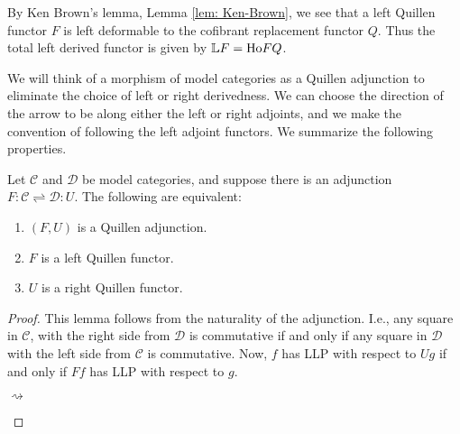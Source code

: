 \documentclass[../thesis.tex]{subfiles}
\begin{document}
            \begin{remark}
                By Ken Brown's lemma, Lemma \ref{lem: Ken-Brown}, we see that a left Quillen functor $F$ is left deformable to the cofibrant replacement functor $Q$. Thus the total left derived functor is given by $\mathbb{L}F = \tt{Ho} FQ$.
            \end{remark}

            We will think of a morphism of model categories as a Quillen adjunction to eliminate the choice of left or right derivedness. We can choose the direction of the arrow to be along either the left or right adjoints, and we make the convention of following the left adjoint functors. We summarize the following properties.

            \begin{lemma}\label{lem: Quill-adj}
                Let $\mathcal{C}$ and $\mathcal{D}$ be model categories, and suppose there is an adjunction $F:\mathcal{C}\rightleftharpoons\mathcal{D}:U$. The following are equivalent:
                \begin{enumerate}
                    \item $(F,U)$ is a Quillen adjunction.
                    \item $F$ is a left Quillen functor.
                    \item $U$ is a right Quillen functor.
                \end{enumerate}
            \end{lemma}

            \begin{proof}
                This lemma follows from the naturality of the adjunction. I.e., any square in $\mathcal{C}$, with the right side from $\mathcal{D}$ is commutative if and only if any square in $\mathcal{D}$ with the left side from $\mathcal{C}$ is commutative. Now, $f$ has LLP with respect to $Ug$ if and only if $Ff$ has LLP with respect to $g$.
                \begin{center}
                     $\rightsquigarrow$
                \end{center} 
            \end{proof}
\end{document}
